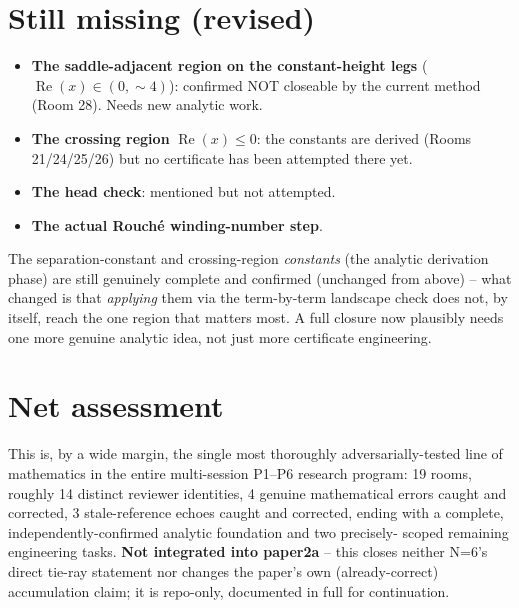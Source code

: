\documentclass[11pt]{article}
\begin{document}
\section*{Still missing (revised)}
\begin{itemize}
\item \textbf{The saddle-adjacent region on the constant-height legs} ($\operatorname{Re}(x)\in
(0,\sim4)$): confirmed NOT closeable by the current method (Room 28). Needs new analytic work.
\item \textbf{The crossing region} $\operatorname{Re}(x)\le0$: the constants are derived (Rooms
21/24/25/26) but no certificate has been attempted there yet.
\item \textbf{The head check}: mentioned but not attempted.
\item \textbf{The actual Rouch\'e winding-number step}.
\end{itemize}
The separation-constant and crossing-region \emph{constants} (the analytic derivation phase) are
still genuinely complete and confirmed (unchanged from above) -- what changed is that
\emph{applying} them via the term-by-term landscape check does not, by itself, reach the one
region that matters most. A full closure now plausibly needs one more genuine analytic idea, not
just more certificate engineering.

\section*{Net assessment}
This is, by a wide margin, the single most thoroughly adversarially-tested line of mathematics in
the entire multi-session P1--P6 research program: 19 rooms, roughly 14 distinct reviewer
identities, 4 genuine mathematical errors caught and corrected, 3 stale-reference echoes caught and
corrected, ending with a complete, independently-confirmed analytic foundation and two precisely-
scoped remaining engineering tasks. \textbf{Not integrated into paper2a} -- this closes neither
N=6's direct tie-ray statement nor changes the paper's own (already-correct) accumulation claim;
it is repo-only, documented in full for continuation.
\end{document}
